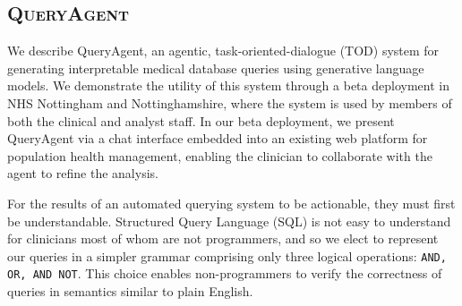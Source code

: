\documentclass[11pt]{article}
\begin{document}




\subsection{\textsc{QueryAgent}}
We describe QueryAgent, an agentic, task-oriented-dialogue (TOD) system for generating interpretable medical database queries using generative language models. We demonstrate the utility of this system through a beta deployment in NHS Nottingham and Nottinghamshire, where the system is used by members of both the clinical and analyst staff.
In our beta deployment, we present QueryAgent via a chat interface embedded into an existing web platform for population health management, enabling the clinician to collaborate with the agent to refine the analysis. %

For the results of an automated querying system to be actionable, they must first be understandable.
Structured Query Language (SQL) is not easy to understand for clinicians most of whom are not programmers, and so we elect to represent our queries in a simpler grammar comprising only three logical operations: \texttt{AND, OR, AND NOT}.
This choice enables non-programmers to verify the correctness of queries in semantics similar to plain English.

\end{document}
